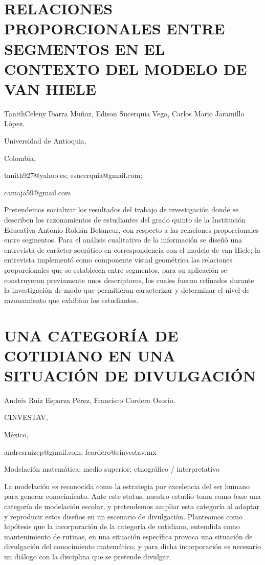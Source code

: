 \section{RELACIONES PROPORCIONALES ENTRE SEGMENTOS EN EL CONTEXTO DEL MODELO
DE VAN HIELE}

\begin{datos}

TanithCeleny Ibarra Muñoz, Edison Sucerquia Vega, Carlos Mario Jaramillo
López. 

Universidad de Antioquia,

Colombia,

tanith927@yahoo.es; esucerquia@gmail.com;

camaja59@gmail.com

\end{datos}

Pretendemos socializar los resultados del trabajo de investigación
donde se describen los razonamientos de estudiantes del grado quinto
de la Institución Educativa Antonio Roldán Betancur, con respecto
a las relaciones proporcionales entre segmentos. Para el análisis
cualitativo de la información se diseñó una entrevista de carácter
socrático en correspondencia con el modelo de van Hiele; la entrevista
implementó como componente visual geométrica las relaciones proporcionales
que se establecen entre segmentos, para su aplicación se construyeron
previamente unos descriptores, los cuales fueron refinados durante
la investigación de modo que permitieran caracterizar y determinar
el nivel de razonamiento que exhibían los estudiantes.


\section{UNA CATEGORÍA DE COTIDIANO EN UNA SITUACIÓN DE DIVULGACIÓN}

\begin{datos}

Andrés Ruiz Esparza Pérez, Francisco Cordero Osorio.

CINVESTAV, 

México,

andresruizep@gmail.com; fcordero@cinvestav.mx 

\end{datos}

Modelación matemática; medio superior; etnográfico / interpretativo

La modelación es reconocida como la estrategia por excelencia del
ser humano para generar conocimiento. Ante este status, nuestro estudio
toma como base una categoría de modelación escolar, y pretendemos
ampliar esta categoría al adaptar y reproducir estos diseños en un
escenario de divulgación. Planteamos como hipótesis que la incorporación
de la categoría de cotidiano, entendida como mantenimiento de rutinas,
en una situación específica provoca una situación de divulgación del
conocimiento matemático, y para dicha incorporación es necesario un
diálogo con la disciplina que se pretende divulgar.


